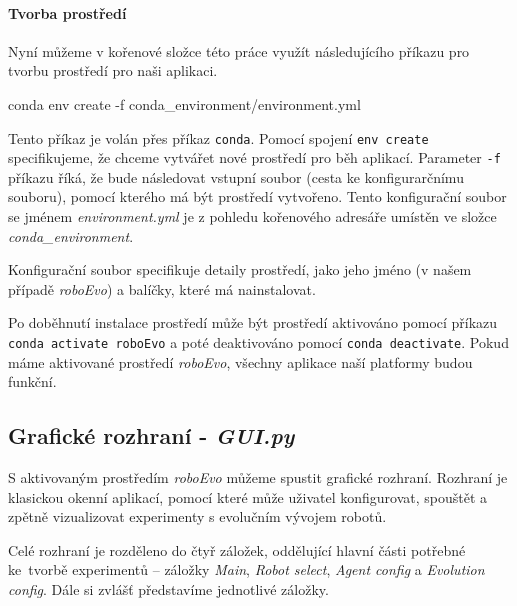 \paragraph{Tvorba prostředí}
Nyní můžeme v kořenové složce této práce využít následujícího příkazu pro
tvorbu prostředí pro naši aplikaci.
\begin{code}
conda env create -f conda_environment/environment.yml
\end{code}
Tento příkaz je volán přes příkaz \texttt{conda}. Pomocí spojení \texttt{env
create} specifikujeme, že chceme vytvářet nové prostředí pro běh aplikací.
Parameter \texttt{-f} příkazu říká, že bude následovat vstupní soubor (cesta ke
konfigurarčnímu souboru), pomocí kterého má být prostředí vytvořeno. Tento
konfigurační soubor se jménem \emph{environment.yml} je z pohledu kořenového
adresáře umístěn ve složce \emph{conda\_environment}.

Konfigurační soubor specifikuje detaily prostředí, jako jeho jméno (v našem
případě \emph{roboEvo}) a balíčky, které má nainstalovat.

Po doběhnutí instalace prostředí může být prostředí aktivováno pomocí příkazu
\texttt{conda activate roboEvo} a poté deaktivováno pomocí \texttt{conda
deactivate}. Pokud máme aktivované prostředí \emph{roboEvo}, všechny aplikace
naší platformy budou funkční.

\subsection{Grafické rozhraní - \emph{GUI.py}} \label{doc_12_GUI}

S aktivovaným prostředím \emph{roboEvo} můžeme spustit grafické rozhraní.
Rozhraní je klasickou okenní aplikací, pomocí které může uživatel konfigurovat,
spouštět a zpětně vizualizovat experimenty s evolučním vývojem robotů.

Celé rozhraní je rozděleno do čtyř záložek, oddělující hlavní části potřebné
ke~tvorbě experimentů -- záložky \emph{Main}, \emph{Robot select}, \emph{Agent
config} a \emph{Evolution config}. Dále si zvlášť představíme jednotlivé
záložky.


